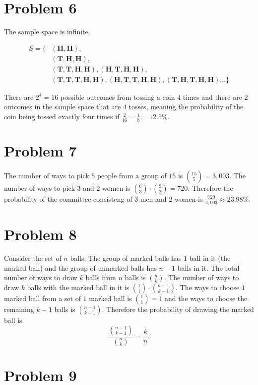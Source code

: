 \documentclass[12pt]{extarticle}
\begin{document}
\section*{Problem 6}
The sample space is infinite.

\def\Heads{\mathbf{H}}
\def\Tails{\mathbf{T}}
\begin{align*}
	S = \{
		&(\Heads, \Heads), \\
		&(\Tails, \Heads, \Heads), \\
		&(\Tails, \Tails, \Heads, \Heads),
		(\Heads, \Tails, \Heads, \Heads), \\
		&(\Tails, \Tails, \Tails, \Heads, \Heads),
		(\Heads, \Tails, \Tails, \Heads, \Heads),
		(\Tails, \Heads, \Tails, \Heads, \Heads) \ldots \}
\end{align*}

There are $2^4 = 16$ possible outcomes from tossing a coin 4 times and there are $2$ outcomes in the sample space that are $4$ tosses, meaning the probability of the coin being tossed exactly four times if $\frac{2}{16} = \frac{1}{8} = 12.5\%$.

\section*{Problem 7}
The number of ways to pick $5$ people from a group of $15$ is $\binom{15}{5} = 3,003$. The number of ways to pick $3$ and $2$ women is $\binom{6}{3} \cdot \binom{9}{2} = 720$. Therefore the probability of the committee consisteng of $3$ men and $2$ women is $\frac{720}{3,003} \approx 23.98\%$.

\section*{Problem 8}
Consider the set of $n$ balls. The group of marked balls has $1$ ball in it (the marked ball) and the group of unmarked balls has $n - 1$ balls in it. The total number of ways to draw $k$ balls from $n$ balls is $\binom{n}{k}$. The number of ways to draw $k$ balls with the marked ball in it is $\binom{1}{1} \cdot \binom{n-1}{k-1}$. The ways to choose $1$ marked ball from a set of $1$ marked ball is $\binom{1}{1} = 1$ and the ways to choose the remaining $k-1$ balls is $\binom{n-1}{k-1}$. Therefore the probability of drawing the marked ball is
\[
	\frac{\binom{n-1}{k-1}}{\binom{n}{k}} = \frac{k}{n}
.\]

\section*{Problem 9}
\end{document}
